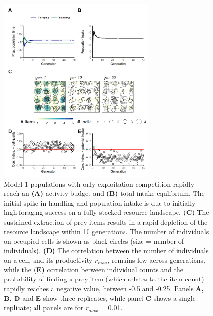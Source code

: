 \documentclass[11pt]{article}
\begin{document}
\begin{figure}[h!]
    \centering
    \includegraphics[width=0.70\textwidth]{figures/fig_02.png}
    \caption{
        Model 1 populations with only exploitation competition rapidly reach an \textbf{(A)} activity budget and \textbf{(B)} total intake equlibrium. The initial spike in handling and population intake is due to initially high foraging success on a fully stocked resource landscape.
        \textbf{(C)} The sustained extraction of prey-items results in a rapid depletion of the resource landscape within 10 generations. The number of individuals on occupied cells is shown as black circles (size = number of individuals). 
        \textbf{(D)} The correlation between the number of individuals on a cell, and its productivity $r_{max}$, remains low across generations, while the 
        \textbf{(E)} correlation between individual counts and the probability of finding a prey-item (which relates to the item count) rapidly reaches a negative value, between -0.5 and -0.25.
        Panels \textbf{A, B, D} and \textbf{E} show three replicates, while panel \textbf{C} shows a single replicate; all panels are for $r_{max}$ = 0.01.
    }
    \label{Fig:Model1}
\end{figure}
\end{document}
